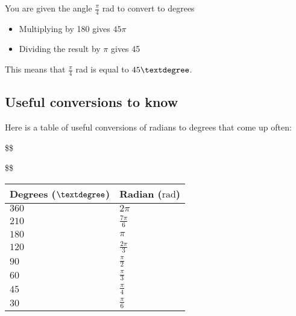 \documentclass[
  12pt,
  a4paper, oneside]{starmastarticle}
\providecommand{\tightlist}{%
  \setlength{\itemsep}{0pt}\setlength{\parskip}{0pt}}\usepackage{longtable,booktabs,array}
\begin{document}
You are given the angle \(\frac{\pi}{4}\) rad to convert to degrees

\begin{itemize}
\tightlist
\item
  Multiplying by 180 gives \(45\pi\)
\item
  Dividing the result by \(\pi\) gives 45
\end{itemize}

This means that \(\frac{\pi}{4}\) rad is equal to \(45\textdegree\).

\hypertarget{useful-conversions-to-know}{%
\subsection{Useful conversions to
know}\label{useful-conversions-to-know}}

Here is a table of useful conversions of radians to degrees that come up
often:

\$\$


\$\$

\begin{longtable}[]{@{}ll@{}}
\toprule()
Degrees (\(\textdegree\)) & Radian (\(\textrm{rad}\)) \\
\midrule()
\endhead
\(360\) & \(2 \pi\) \\
\(210\) & \(\frac{7\pi}{6}\) \\
\(180\) & \(\pi\) \\
\(120\) & \(\frac{2\pi}{3}\) \\
\(90\) & \(\frac{\pi}{2}\) \\
\(60\) & \(\frac{\pi}{3}\) \\
\(45\) & \(\frac{\pi}{4}\) \\
\(30\) & \(\frac{\pi}{6}\) \\
\bottomrule()
\end{longtable}
\end{document}
